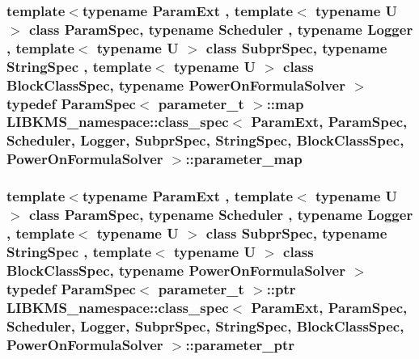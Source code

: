 \hypertarget{structLIBKMS__namespace_1_1class__spec_a084ce0bd5bd9ead6059b0e35d04a4785}{
\subsubsection[{parameter\-\_\-map}]{\setlength{\rightskip}{0pt plus 5cm}template$<$typename Param\-Ext , template$<$ typename U $>$ class Param\-Spec, typename Scheduler , typename Logger , template$<$ typename U $>$ class Subpr\-Spec, typename String\-Spec , template$<$ typename U $>$ class Block\-Class\-Spec, typename Power\-On\-Formula\-Solver $>$ typedef Param\-Spec$<$ {\bf parameter\-\_\-t} $>$\-::map {\bf L\-I\-B\-K\-M\-S\-\_\-namespace\-::class\-\_\-spec}$<$ Param\-Ext, Param\-Spec, Scheduler, Logger, Subpr\-Spec, String\-Spec, Block\-Class\-Spec, Power\-On\-Formula\-Solver $>$\-::{\bf parameter\-\_\-map}}}\label{structLIBKMS__namespace_1_1class__spec_a084ce0bd5bd9ead6059b0e35d04a4785}
\hypertarget{structLIBKMS__namespace_1_1class__spec_aa835ddc774b27dd4d551341d64b4d945}{
\subsubsection[{parameter\-\_\-ptr}]{\setlength{\rightskip}{0pt plus 5cm}template$<$typename Param\-Ext , template$<$ typename U $>$ class Param\-Spec, typename Scheduler , typename Logger , template$<$ typename U $>$ class Subpr\-Spec, typename String\-Spec , template$<$ typename U $>$ class Block\-Class\-Spec, typename Power\-On\-Formula\-Solver $>$ typedef Param\-Spec$<$ {\bf parameter\-\_\-t} $>$\-::ptr {\bf L\-I\-B\-K\-M\-S\-\_\-namespace\-::class\-\_\-spec}$<$ Param\-Ext, Param\-Spec, Scheduler, Logger, Subpr\-Spec, String\-Spec, Block\-Class\-Spec, Power\-On\-Formula\-Solver $>$\-::{\bf parameter\-\_\-ptr}}}\label{structLIBKMS__namespace_1_1class__spec_aa835ddc774b27dd4d551341d64b4d945}
